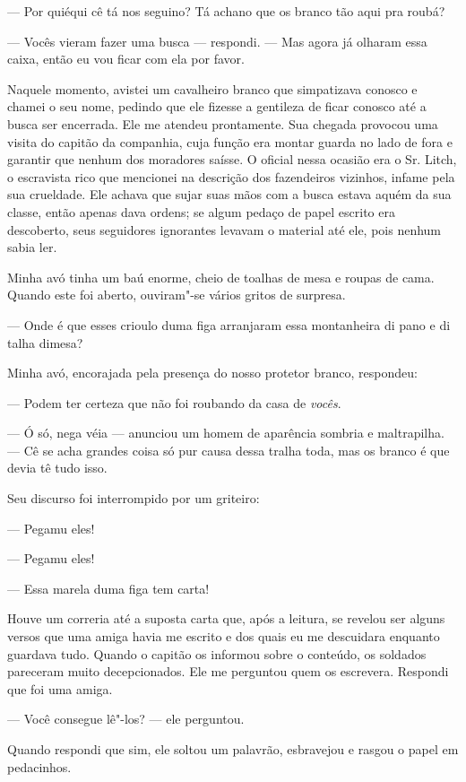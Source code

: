 --- Por quiéqui cê tá nos seguino? Tá achano que os branco tão aqui pra
roubá?

--- Vocês vieram fazer uma busca ---
respondi. --- Mas agora já olharam essa caixa, então eu vou ficar com
ela por favor.

Naquele momento, avistei um cavalheiro
branco que simpatizava conosco e chamei o seu nome, pedindo que ele
fizesse a gentileza de ficar conosco até a busca ser encerrada. Ele me
atendeu prontamente. Sua chegada provocou uma visita do capitão da
companhia, cuja função era montar guarda no lado de fora e garantir que
nenhum dos moradores saísse. O oficial nessa ocasião era o Sr. Litch, o
escravista rico que mencionei na descrição dos fazendeiros vizinhos,
infame pela sua crueldade. Ele achava que sujar suas mãos com a busca
estava aquém da sua classe, então apenas dava ordens; se algum pedaço de
papel escrito era descoberto, seus seguidores ignorantes levavam o
material até ele, pois nenhum sabia ler.

Minha avó tinha um baú enorme, cheio de
toalhas de mesa e roupas de cama. Quando este foi aberto, ouviram"-se
vários gritos de surpresa.

--- Onde é que esses crioulo duma figa arranjaram essa montanheira di
pano e di talha dimesa?

Minha avó, encorajada pela presença do
nosso protetor branco, respondeu:

--- Podem ter certeza que não foi roubando da casa de \emph{vocês}.

--- Ó só, nega véia --- anunciou um
homem de aparência sombria e maltrapilha. --- Cê se acha grandes coisa
só pur causa dessa tralha toda, mas os branco é que devia tê tudo isso.

Seu discurso foi interrompido por um
griteiro:

--- Pegamu eles!

--- Pegamu eles!

--- Essa marela duma figa tem carta!

Houve um correria até a suposta carta
que, após a leitura, se revelou ser alguns versos que uma amiga havia me
escrito e dos quais eu me descuidara enquanto guardava tudo. Quando o
capitão os informou sobre o conteúdo, os soldados pareceram muito
decepcionados. Ele me perguntou quem os escrevera. Respondi que foi uma
amiga.

--- Você consegue lê"-los? --- ele perguntou.

Quando respondi que sim, ele soltou um palavrão, esbravejou e rasgou o
papel em pedacinhos.

